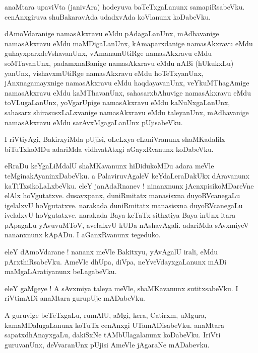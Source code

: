 \documentclass{article}
\begin{document}
\begin{mn}%
anaMtara upaviVta (janivAra) hodeyuva baTeTxgaLanunx samapiRsabeVku. cenAnxgiruva shuBakaravAda 
udadxvAda koVlanunx koDabeVku.
\end{mn}

\begin{mn}%
dAmoVdaranige namasAkxravu eMdu pAdagaLanUnx, mAdhavanige namasAkxravu eMdu maMDigaLanUnx, 
kAmaparxdanige namasAkxravu eMdu guhayxparxdeVshavanUnx, vAmanamUtiRge namasAkxravu eMdu 
soMTavanUnx, padamxnaBanige namasAkxravu eMdu nABi (hUkukxLu) yanUnx, vishavxmUtiRge namasAkxravu 
eMdu hoTeTxyanUnx, jAnxnagamayxnige namasAkxravu eMdu haqdayavanUnx, veYkuMThagAmige namasAkxravu 
eMdu kaMThavanUnx, sahasarxbAhuvige namasAkxravu eMdu toVLugaLanUnx, yoVgarUpige namasAkxravu eMdu 
kaNuNxgaLanUnx, sahasarx shirasusxLaLxvanige namasAkxravu eMdu taleyanUnx, mAdhavanige 
namasAkxravu eMdu sarAvxMgagaLanUnx pUjisabeVku.
\end{mn}

\begin{mn}%
I riVtiyAgi, BakirxyiMda pUjisi, oLeLxya eLaniVranunx shaMKadalilx biTuTxkoMDu adariMda 
vidhvatAtxgi aGayxRvanunx koDabeVku.
\end{mn}

\begin{mn}%
eRraDu keYgaLiMdalU shaMKavanunx hiDidukoMDu adara meVle teMginakAyaninxDabeVku. a PalaviruvAgaleV 
keYdaLeraDakUkx dAravanunx kaTiTxsikoLaLxbeVku. eleY janAdaRnanev ! ninanxnunx jAcnxpisikoMDareVne 
elAlx hoVgutatxve. dusavxpanx, duniRmitatx manasisxna duyoRVcanegaLu igelalxvU hoVgutatxve. 
narakada duniRmitatx manasisxna duyoRVcanegaLu ivelalxvU hoVgutatxve. narakada Baya keTaTx 
sithxtiya Baya inUnx itara pApagaLu yAvuvuMToV, avelalxvU kUDa nAshavAgali. adariMda sAvxmiyeV 
nananxnunx kApADu. I aGanxRvanunx tegeduko.
\end{mn}

\begin{mn}%
eleY dAmoVdarane ! nananx meVle Bakitxyu, yAvAgalU irali, eMdu pArxthiRsabeVku. AmeVle dhUpa, 
diVpa, neYveVdayxgaLanunx mADi maMgaLAratiyanunx beLagabeVku.
\end{mn}

\begin{mn}%
eleY gaMgeye ! A sAvxmiya taleya meVle, shaMKavanunx sutitxsabeVku. I riVtimADi anaMtara gurupUje 
mADabeVku.
\end{mn}

\begin{mn}%
A guruvige beTeTxgaLu, rumAlU, aMgi, kera, Catirxm, uMgura, kamaMDalugaLanunx koTuTx cenAnxgi 
UTamADisabeVku. anaMtara sapatxdhAnayxgaLu, dakiSxNe tAMbUlagalanunx koDabeVku. IriVti guruvanUnx, 
deVvaranUnx pUjisi AmeVle jAgaraNe mADabevku.
\end{mn}
\end{document}
